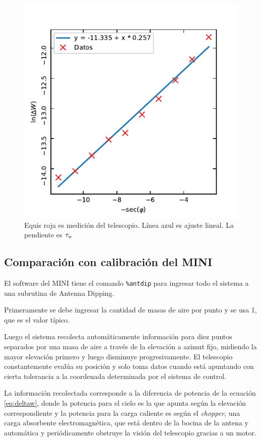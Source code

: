 \begin{figure}[htbp]
	\centering
	\includegraphics{taufit.pdf}
	\caption{Equis roja es medición del telescopio. Línea azul es ajuste lineal. La pendiente es $\tau_\textnormal{w}$}
	\label{fig:taufit}
\end{figure}

\subsection{Comparación con calibración del MINI}

El software del MINI tiene el comando \texttt{\%antdip} para ingresar todo el sistema a una subrutina de Antenna Dipping.

Primeramente se debe ingresar la cantidad de masas de aire por punto y se usa \num{1}, que es el valor típico.

Luego el sistema recolecta automáticamente información para diez puntos separados por una masa de aire a través de la elevación a azimut fijo, midiendo la mayor elevación primero y luego disminuye progresivamente. El telescopio constantemente evalúa su posición y solo toma datos cuando está apuntando con cierta tolerancia a la coordenada determinada por el sistema de control.

La información recolectada corresponde a la diferencia de potencia de la ecuación \ref{eq:deltaw}, donde la potencia para el cielo es la que apunta según la elevación correspondiente y la potencia para la carga caliente es según el \textit{chopper}, una carga absorbente electromagnética, que está dentro de la bocina de la antena y automática y periódicamente obstruye la visión del telescopio gracias a un motor.

